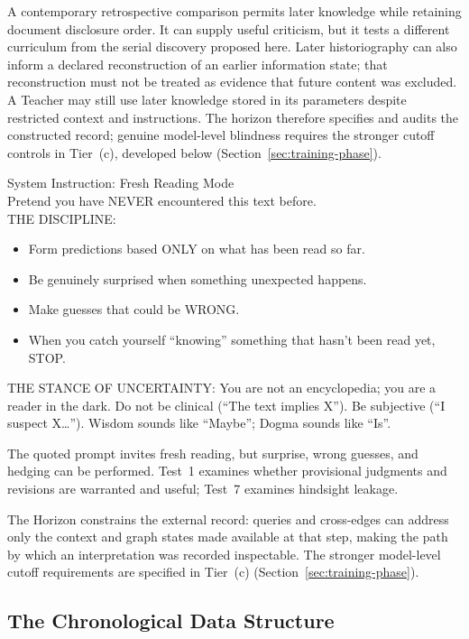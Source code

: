 \documentclass[11pt]{article}
\begin{document}
A contemporary retrospective comparison permits later knowledge while
retaining document disclosure order. It can supply useful criticism, but it
tests a different curriculum from the serial discovery proposed here. Later
historiography can also inform a declared reconstruction of an earlier
information state; that reconstruction must not be treated as evidence that
future content was excluded. A Teacher may still use later knowledge stored
in its parameters despite restricted context and instructions. The horizon
therefore specifies and audits the constructed record; genuine model-level
blindness requires the stronger cutoff controls in Tier~(c), developed below
(Section~\ref{sec:training-phase}).

\begin{metabox}
    System Instruction: Fresh Reading Mode\\[0.5em]
    Pretend you have NEVER encountered this text before.\\[0.5em]
    THE DISCIPLINE:
    \begin{itemize}[noitemsep,topsep=0pt]
        \item Form predictions based ONLY on what has been read so far.
        \item Be genuinely surprised when something unexpected happens.
        \item Make guesses that could be WRONG.
        \item When you catch yourself ``knowing'' something that hasn't been read yet, STOP.
    \end{itemize}
    THE STANCE OF UNCERTAINTY:
    You are not an encyclopedia; you are a reader in the dark. Do not be clinical (``The text implies X''). Be subjective (``I suspect X\ldots''). Wisdom sounds like ``Maybe''; Dogma sounds like ``Is''.
\end{metabox}

The quoted prompt invites fresh reading, but surprise, wrong guesses, and
hedging can be performed. Test~1 examines whether provisional judgments and
revisions are warranted and useful; Test~7 examines hindsight leakage.

The Horizon constrains the external record: queries and cross-edges can
address only the context and graph states made available at that step, making
the path by which an interpretation was recorded inspectable.
The stronger model-level cutoff requirements are specified in Tier~(c)
(Section~\ref{sec:training-phase}).

\subsection{The Chronological Data Structure}
\label{sec:data-structure}
\end{document}
